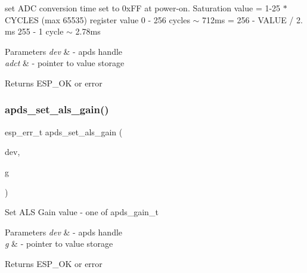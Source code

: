 \begin{DoxyItemize}
\item set A\+DC conversion time set to 0x\+FF at power-\/on. Saturation value = 1-\/25 $\ast$ C\+Y\+C\+L\+ES (max 65535) register value 0 -\/ 256 cycles $\sim$ 712ms = 256 -\/ V\+A\+L\+UE / 2. ms 255 -\/ 1 cycle $\sim$ 2.\+78ms 
\end{DoxyItemize}


\begin{DoxyParams}{Parameters}
{\em dev} & -\/ apds handle \\
\hline
{\em adct} & -\/ pointer to value storage \\
\hline
\end{DoxyParams}
\begin{DoxyReturn}{Returns}
E\+S\+P\+\_\+\+OK or error 
\end{DoxyReturn}
\mbox{\label{group__APDS9960__ALSFunctions_ga11ad5a3f974f5e881bf74cf7c4483333}} 
\subsubsection{\texorpdfstring{apds\+\_\+set\+\_\+als\+\_\+gain()}{apds\_set\_als\_gain()}}
{\footnotesize\ttfamily esp\+\_\+err\+\_\+t apds\+\_\+set\+\_\+als\+\_\+gain (\begin{DoxyParamCaption}\item[{\hyperlink{structAPDS9960__Driver}{A\+P\+D\+S\+\_\+\+D\+EV}}]{dev,  }\item[{als\+\_\+gain\+\_\+t $\ast$}]{g }\end{DoxyParamCaption})}




\begin{DoxyItemize}
\item Set A\+LS Gain value -\/ one of apds\+\_\+gain\+\_\+t 
\end{DoxyItemize}


\begin{DoxyParams}{Parameters}
{\em dev} & -\/ apds handle \\
\hline
{\em g} & -\/ pointer to value storage \\
\hline
\end{DoxyParams}
\begin{DoxyReturn}{Returns}
E\+S\+P\+\_\+\+OK or error 
\end{DoxyReturn}
\mbox{\label{group__APDS9960__ALSFunctions_ga004d0bfdb06f9a8021ddc970e27f56c6}} 
